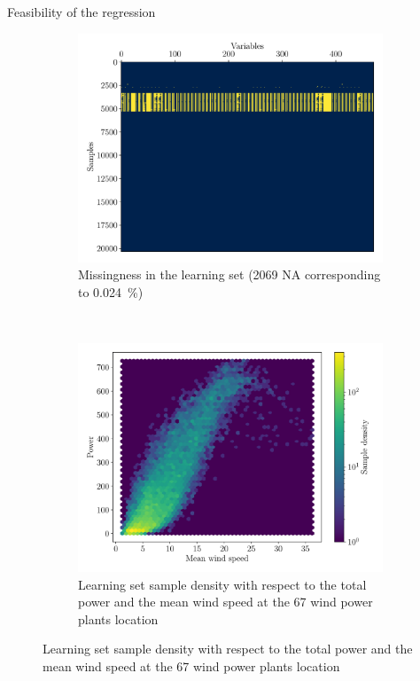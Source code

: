 \documentclass[12pt]{beamer}
\begin{document}
\begin{frame}{Feasibility of the regression}
	\begin{figure}[H]
		\centering
		\begin{subfigure}{.48\textwidth}
			\includegraphics[width=\textwidth]{resources/pdf/wind_missingness.pdf}
			\caption{Missingness in the learning set (2069 NA corresponding to \SI{0.024}{\percent})}
		\end{subfigure}
		~
		\begin{subfigure}{.48\textwidth}
			\includegraphics[width=\textwidth]{resources/pdf/wind_wallonia_pc.pdf}
			\caption{Learning set sample density with respect to the total power and the mean wind speed at the 67 wind power plants location}
		\end{subfigure}
	\end{figure}
\end{frame}
\end{document}
